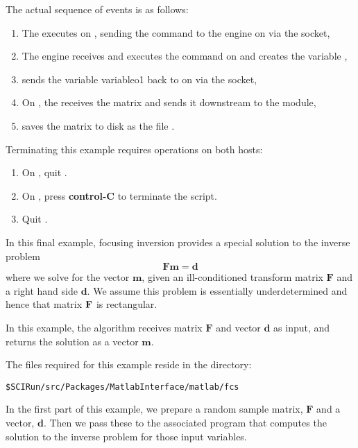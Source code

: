The actual sequence of events is as follows:
%
\begin{enumerate}
  \item The \mlm{} executes on , sending the \m{} 
        command
        to the engine on  via the socket,
  \item The engine receives and executes the command on 
         and creates the variable ,
  \item {} sends the variable  variable{o1} back to \sr{} on
         via the socket,
  \item On , the \mlm{} receives the matrix and 
        sends it downstream to the  module,
  \item {} saves the matrix to disk as the file
        .
\end{enumerate}

Terminating this example requires operations on both hosts:
%
\begin{enumerate} 
  \item On , quit \sr{}.  
  \item On , press {\bf control-C} to terminate the
         script.
  \item Quit \m{}.
\end{enumerate}



In this final example, focusing inversion provides a special solution to
the inverse problem
%
\begin{equation}
  \mathbf{F} \mathbf{m} = \mathbf{d} 
\end{equation}
%
where we solve for the vector $\mathbf{m}$, given an ill-conditioned
transform matrix $\mathbf{F}$ and a right hand side $\mathbf{d}$.  We
assume this problem is essentially underdetermined and hence that matrix
${\bf F}$ is rectangular.

In this example, the algorithm receives matrix $\mathbf{F}$ and vector
$\mathbf{d}$ as input, and returns the solution as a vector $\mathbf{m}$.

The files required for this example reside in the directory:
%
\begin{verbatim}
$SCIRun/src/Packages/MatlabInterface/matlab/fcs
\end{verbatim}

In the first part of this example, we prepare a random sample matrix,
$\mathbf{F}$ and a vector, $\mathbf{d}$.  Then we pass these to the
associated \m{} program that computes the solution to the inverse
problem for those input variables.

